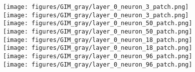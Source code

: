 \documentclass{article}
\begin{document}
 \begin{figure}
    \centering
\texttt{[image: figures/GIM\_gray/layer\_0\_neuron\_3\_patch.png]}
        \hspace{-4pt}
        \texttt{[image: figures/GIM\_gray/layer\_0\_neuron\_3\_patch.png]}
        \hfill
        \texttt{[image: figures/GIM\_gray/layer\_0\_neuron\_50\_patch.png]}
        \hspace{-4pt}
        \texttt{[image: figures/GIM\_gray/layer\_0\_neuron\_50\_patch.png]}
        \hfill
        \texttt{[image: figures/GIM\_gray/layer\_0\_neuron\_18\_patch.png]}
        \hspace{-4pt}
        \texttt{[image: figures/GIM\_gray/layer\_0\_neuron\_18\_patch.png]}
        \hfill
        \texttt{[image: figures/GIM\_gray/layer\_0\_neuron\_96\_patch.png]}
        \hspace{-4pt}
        \texttt{[image: figures/GIM\_gray/layer\_0\_neuron\_96\_patch.png]}
\\
        \vspace{.5em}



\end{figure}
\end{document}
